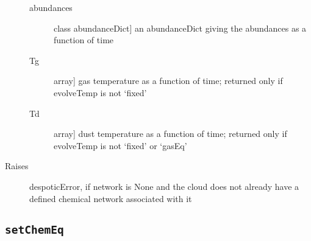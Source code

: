 \documentclass[letterpaper,10pt,english]{sphinxmanual}
\begin{document}
\begin{fulllineitems}
\begin{description}
\begin{description}
\item[{abundances}] \leavevmode{[}class abundanceDict{]}
an abundanceDict giving the abundances as a function of time

\item[{Tg}] \leavevmode{[}array{]}
gas temperature as a function of time; returned only if
evolveTemp is not `fixed'

\item[{Td}] \leavevmode{[}array{]}
dust temperature as a function of time; returned only if
evolveTemp is not `fixed' or `gasEq'

\end{description}

\item[{Raises}] \leavevmode
despoticError, if network is None and the cloud does not already
have a defined chemical network associated with it

\end{description}

\end{fulllineitems}



\subsection{\texttt{setChemEq}}
\label{fulldoc:setchemeq}
\end{document}
